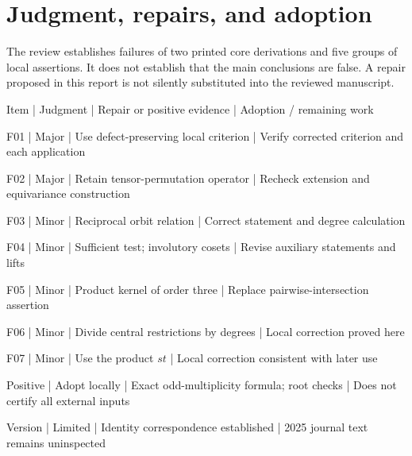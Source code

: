 \documentclass[10pt]{article}
\begin{document}
\section*{Judgment, repairs, and adoption}
The review establishes failures of two printed core derivations and five groups of local assertions. It does not establish that the main conclusions are false. A repair proposed in this report is not silently substituted into the reviewed manuscript.\par
Item | Judgment | Repair or positive evidence | Adoption / remaining work\par
F01 | Major | Use defect-preserving local criterion | Verify corrected criterion and each application\par
F02 | Major | Retain tensor-permutation operator | Recheck extension and equivariance construction\par
F03 | Minor | Reciprocal orbit relation | Correct statement and degree calculation\par
F04 | Minor | Sufficient test; involutory cosets | Revise auxiliary statements and lifts\par
F05 | Minor | Product kernel of order three | Replace pairwise-intersection assertion\par
F06 | Minor | Divide central restrictions by degrees | Local correction proved here\par
F07 | Minor | Use the product \(st\) | Local correction consistent with later use\par
Positive | Adopt locally | Exact odd-multiplicity formula; root checks | Does not certify all external inputs\par
Version | Limited | Identity correspondence established | 2025 journal text remains uninspected\par
\end{document}
